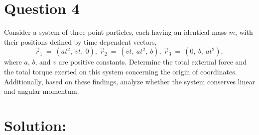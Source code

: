 \section*{Question 4}
Consider a system of three point particles, each having an identical mass $m$, with their positions defined by time-dependent vectors,
\begin{equation*}
    \vec r_{1}~=~(at^2,~vt,~0),~\vec r_{2}~=~(vt,~at^2,~b),~\vec r_{3}~=~(0,~b,~at^2), 
\end{equation*}
where $a$, $b$, and $v$ are positive constants. Determine the total external force and the total torque exerted on this system concerning the origin of coordinates. Additionally, based on these findings, analyze whether the system conserves linear and angular momentum.

\section*{Solution:}